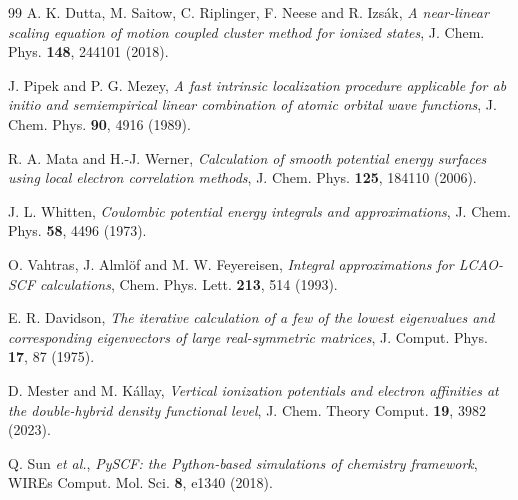 \documentclass[aip,jcp,amsmath,amssymb,preprint,superscriptaddress]{revtex4-2}%
\begin{document}
\begin{thebibliography}{99}
 A. K. Dutta, M. Saitow, C. Riplinger, F. Neese and
  R. Izs\'ak, \emph{A near-linear scaling equation of motion coupled cluster
  method for ionized states},
  J. Chem. Phys. \textbf{148}, 244101 (2018).

 J. Pipek and P. G. Mezey,
  \emph{A fast intrinsic localization procedure applicable for ab initio and
  semiempirical linear combination of atomic orbital wave functions},
  J. Chem. Phys. \textbf{90}, 4916 (1989).

 R. A. Mata and H.-J. Werner,
  \emph{Calculation of smooth potential energy surfaces using local electron
  correlation methods}, J. Chem. Phys. \textbf{125}, 184110 (2006).

 J. L. Whitten,
  \emph{Coulombic potential energy integrals and approximations},
  J. Chem. Phys. \textbf{58}, 4496 (1973).

 O. Vahtras, J. Alml\"of and M. W. Feyereisen,
  \emph{Integral approximations for LCAO-SCF calculations},
  Chem. Phys. Lett. \textbf{213}, 514 (1993).

 E. R. Davidson,
  \emph{The iterative calculation of a few of the lowest eigenvalues and
  corresponding eigenvectors of large real-symmetric matrices},
  J. Comput. Phys. \textbf{17}, 87 (1975).

 D. Mester and M. K\'allay,
  \emph{Vertical ionization potentials and electron affinities at the
  double-hybrid density functional level},
  J. Chem. Theory Comput. \textbf{19}, 3982 (2023).

 Q. Sun \emph{et al.},
  \emph{PySCF: the Python-based simulations of chemistry framework},
  WIREs Comput. Mol. Sci. \textbf{8}, e1340 (2018).

\end{thebibliography}
\end{document}
